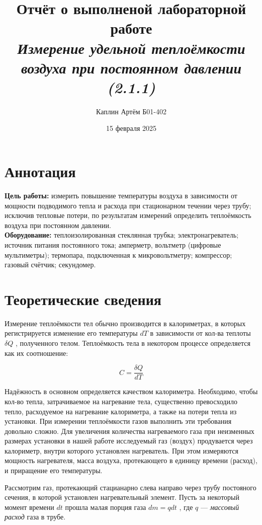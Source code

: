 \documentclass[a4paper,12pt]{article}
\title{\textbf{Отчёт о выполненой лабораторной работе \\ \textit{Измерение удельной теплоёмкости воздуха при постоянном давлении (2.1.1)}}}
\author{Каплин Артём Б01-402}
\date{15 февраля 2025}
\begin{document}
\maketitle

	\section{Аннотация}

	\textbf{Цель работы:} измерить повышение температуры воздуха в зависимости от мощности
подводимого тепла и расхода при стационарном течении через трубу; исключив тепловые потери, по результатам измерений определить теплоёмкость воздуха при постоянном давлении.\\
\newline
	\textbf{Оборудование:} теплоизолированная стеклянная трубка; электронагреватель; источник питания постоянного тока; амперметр, вольтметр (цифровые мультиметры); термопара, подключенная к микровольтметру; компрессор; газовый счётчик;
секундомер.

	\section{Теоретические сведения}

        Измерение теплоёмкости тел обычно производится в калориметрах, в которых регистрируется изменение его температуры \(dT\) в зависимости от кол-ва теплоты \(\delta{Q}\) , полученного телом. Теплоёмкость тела в некотором процессе определяется как их соотношение:

        \[C = \frac{\delta{Q}}{dT}\]

        Надёжность в основном определяется качеством калориметра. Необходимо, чтобы кол-во тепла, затрачиваемое на нагревание тела, существенно превосходило тепло, расходуемое на нагревание калориметра, а также на потери тепла из установки. При измерении теплоёмкости газов выполнить эти требования довольно сложно.  Для увеличения количества нагреваемого газа при неизменных размерах установки в нашей работе исследуемый газ (воздух) продувается через калориметр, внутри которого установлен нагреватель. При этом
        измеряются мощность нагревателя, масса воздуха, протекающего в единицу
        времени (расход), и приращение его температуры.

        Рассмотрим газ, протекающий стацианарно слева направо через трубу постояного сечения, в которой установлен нагревательный элемент. Пусть за некоторый момент времени \(dt\) прошла малая порция газа \(dm = q dt\)  , где \(q\) --- \textit{массовый расход} газа в трубе. 
\end{document}
